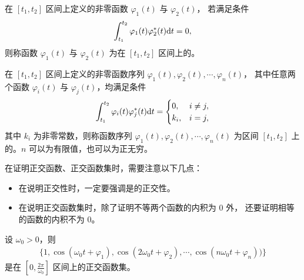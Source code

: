 \begin{definition}[正交函数与正交函数集]
    在 $[t_1, t_2]$ 区间上定义的非零函数 $\varphi_1(t)$ 与 $\varphi_2(t)$，
    若满足条件
    \begin{align*}
        \int_{t_1}^{t_2}\varphi_1(t)\varphi_2^*(t)\mathrm{d}t = 0,
    \end{align*}
    则称函数 $\varphi_1(t)$ 与 $\varphi_2(t)$ 为在 $[t_1, t_2]$ 区间上的。

    在 $[t_1, t_2]$ 区间上定义的非零函数序列 $\varphi_1(t), \varphi_2(t), \cdots, \varphi_n(t)$，
    其中任意两个函数 $\varphi_i(t)$ 与 $\varphi_j(t)$，均满足条件
    \begin{align*}
        \int_{t_1}^{t_2}\varphi_i(t)\varphi_j^*(t)\mathrm{d}t = \begin{cases}
            0, & i \ne j, \\
            k_i, & i = j,
        \end{cases}
    \end{align*}
    其中 $k_i$ 为非零常数，则称函数序列 $\varphi_1(t), \varphi_2(t), \cdots, \varphi_n(t)$
    为区间 $[t_1, t_2]$ 上的。$n$ 可以为有限值，也可以为正无穷。
\end{definition}

\begin{note}
    在证明正交函数、正交函数集时，需要注意以下几点：
    \begin{itemize}
        \item 在说明正交性时，一定要强调是的正交性。
        \item 在说明正交函数集时，除了证明不等两个函数的内积为 $0$ 外，
            还要证明相等的函数的内积不为 $0$。
    \end{itemize}
\end{note}

\begin{example}[三角函数集]
    设 $\omega_0 > 0$，则
    \begin{align*}
        \{1, \cos(\omega_0t + \varphi_1), \cos(2\omega_0t + \varphi_2),
            \cdots, \cos(n\omega_0 t + \varphi_n))\}
    \end{align*}
    是在 $[0, \frac{2\pi}{\omega_0}]$ 区间上的正交函数集。
\end{example}

